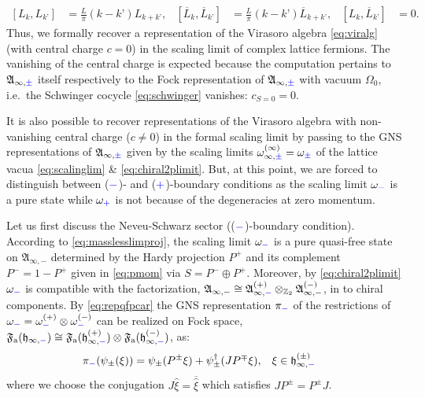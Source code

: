 \documentclass[a4paper, 11pt]{article}
\newcommand{\fA}{\mathfrak{A}}\newcommand{\cA}{\mathcal{A}}\newcommand{\dA}{\mathds{A}}\newcommand{\sA}{\mathscr{A}}
\newcommand{\ua}{\textup a}
\newcommand{\fF}{\mathfrak{F}}\newcommand{\cF}{\mathcal{F}}\newcommand{\dF}{\mathds{F}}\newcommand{\sF}{\mathscr{F}}
\newcommand{\fh}{\mathfrak{h}}
\DeclareMathOperator{\1}{\mathds{1}}
\begin{document}
\begin{align}
\label{eq:scalelimviraCRex}
\left[L_{k}, L_{k’}\right] &\!=\!\tfrac{L}{\pi}(k-k’)L_{k+k’}, & \left[\overline{L}_{k}, \overline{L}_{k’}\right] &\!=\!\tfrac{L}{\pi}(k-k’)\overline{L}_{k+k’}, & \left[L_{k}, \overline{L}_{k’}\right] &\!=\!0.
\end{align}
Thus, we formally recover a representation of the Virasoro algebra \eqref{eq:viralg} (with central charge $c=0$) in the scaling limit of complex lattice fermions. The vanishing of the central charge is expected because the computation pertains to $\fA_{\infty,{\color{blue}\pm}}$ itself respectively to the Fock representation of $\fA_{\infty,{\color{blue}\pm}}$ with vacuum $\Omega_{0}$, i.e.~the Schwinger cocycle \eqref{eq:schwinger} vanishes: $c_{S=0} = 0$.

\medskip

It is also possible to recover representations of the Virasoro algebra with non-vanishing central charge ($c\neq0$) in the formal scaling limit by passing to the GNS representations of $\fA_{\infty,{\color{blue}\pm}}$ given by the scaling limits $\omega^{(\infty)}_{\infty,{\color{blue}\pm}} = \omega_{{\color{blue}\pm}}$ of the lattice vacua \eqref{eq:scalinglim} \& \eqref{eq:chiral2plimit}. But, at this point, we are forced to distinguish between (${\color{blue}-}$)- and (${\color{blue}+}$)-boundary conditions as the scaling limit $\omega_{{\color{blue}-}}$ is a pure state while $\omega_{{\color{blue}+}}$ is not because of the degeneracies at zero momentum.

\medskip

Let us first discuss the Neveu-Schwarz sector ((${\color{blue}-}$)-boundary condition). According to \eqref{eq:masslesslimproj}, the scaling limit $\omega_{{\color{blue}-}}$ is a pure quasi-free state on $\fA_{\infty,-}$ determined by the Hardy projection $P^{+}$ and its complement $P^{-} = 1- P^{+}$ given in \eqref{eq:pmom} via $S = P^{-}\oplus P^{+}$. Moreover, by \eqref{eq:chiral2plimit} $\omega_{{\color{blue}-}}$ is compatible with the factorization, $\fA_{\infty,-}\cong\fA^{(+)}_{\infty,{\color{blue}-}}\otimes_{\Z_{2}}\fA^{(-)}_{\infty,-}$, in to chiral components. By \eqref{eq:repqfpcar} the GNS representation $\pi_{{\color{blue}-}}$ of the restrictions of $\omega_{{\color{blue}-}} = \omega^{(+)}_{{\color{blue}-}}\otimes\omega^{(-)}_{{\color{blue}-}}$ can be realized on Fock space, $\fF_{\ua}(\fh_{\infty,{\color{blue}-}})\cong\fF_{\ua}(\fh^{(+)}_{\infty,{\color{blue}-}})\otimes\fF_{\ua}(\fh^{(-)}_{\infty,{\color{blue}-}})$, as:
\begin{align}
\label{eq:cxrepchi}
\pi_{{\color{blue}-}}(\psi_{\pm}(\xi)) & = \psi_{\pm}(P^{\pm}\xi)+\psi^{\dag}_{\pm}(JP^{\mp}\xi), & \xi & \in\fh^{(\pm)}_{\infty,{\color{blue}-}}
\end{align}
where we choose the conjugation $J\hat{\xi} = \overline{\hat{\xi}}$ which satisfies $JP^{\pm} = P^{\pm}J$.
\end{document}
